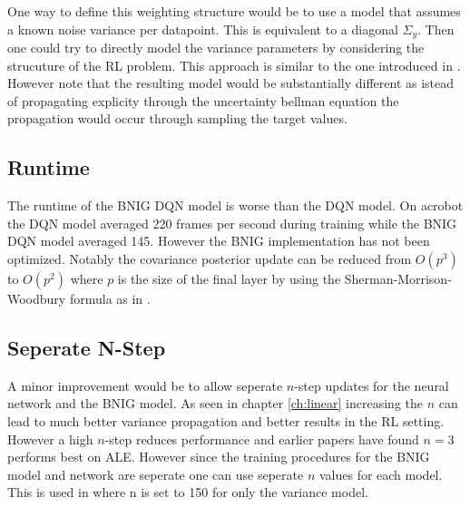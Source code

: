 One way to define this weighting structure would be to use a model that assumes a known noise variance per datapoint. This is equivalent to a diagonal $\Sigma_y$. Then one could try to directly model the variance parameters by considering the strucuture of the RL problem. This approach is similar to the one introduced in \cite{donoghue_2017}. However note that the resulting model would be substantially different as istead of propagating explicity through the uncertainty bellman equation the propagation would occur through sampling the target values.

\subsection{Runtime}

The runtime of the BNIG DQN model is worse than the DQN model. On acrobot the DQN model averaged 220 frames per second during training while the BNIG DQN model averaged 145. However the BNIG implementation has not been optimized. Notably the covariance posterior update can be reduced from $O(p^3)$ to $O(p^2)$ where $p$ is the size of the final layer by using the Sherman-Morrison-Woodbury formula as in \cite{donoghue_2017}.

\subsection{Seperate N-Step}

A minor improvement would be to allow seperate $n$-step updates for the neural network and the BNIG model. As seen in chapter \ref{ch:linear} increasing the $n$ can lead to much better variance propagation and better results in the RL setting. However a high $n$-step reduces performance and earlier papers have found $n=3$ performs best on ALE\citep{hessel_2017}. However since the training procedures for the BNIG model and network are seperate one can use seperate $n$ values for each model. This is used in \cite{donoghue_2017} where n is set to 150 for only the variance model.

\cleardoublepage